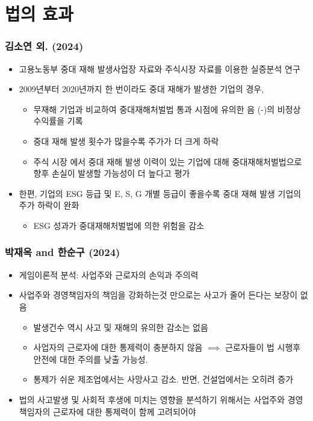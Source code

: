 \documentclass[aspectratio=169,xcolor=dvipsnames,handout]{beamer}
\begin{document}
\section{법의 효과}
\begin{frame}
    \frametitle{김소연 외. (2024)}
    \begin{itemize}[<+->]
        \item 고용노동부 중대 재해 발생사업장 자료와 주식시장 자료를 이용한 실증분석 연구
        \item 2009년부터 2020년까지 한 번이라도 중대 재해가 발생한 기업의 경우,
\begin{itemize}
               \item 무재해 기업과 비교하여 중대재해처벌법 통과 시점에 유의한 음 (-)의 비정상 수익률을 기록
               \item 중대 재해 발생 횟수가 많을수록 주가가 더 크게 하락
        \item 주식 시장 에서 중대 재해 발생 이력이 있는 기업에 대해 중대재해처벌법으로 향후 손실이 발생할 가능성이 더 높다고 평가
\end{itemize}
        \item 한편, 기업의 ESG 등급 및 E, S, G 개별 등급이 좋을수록 중대 재해 발생 기업의 주가 하락이 완화
\begin{itemize}
               \item ESG 성과가 중대재해처벌법에 의한 위험을 감소
\end{itemize}
    \end{itemize}
\end{frame}

\begin{frame}
    \frametitle{박재옥 and 한순구 (2024)}
    \begin{itemize}[<+->]
        \item 게임이론적 분석: 사업주와 근로자의 손익과 주의력
        \item 사업주와 경영책임자의 책임을 강화하는것 만으로는 사고가 줄어 든다는 보장이 없음
\begin{itemize}
               \item 발생건수 역시 사고 및 재해의 유의한 감소는 없음
               \item 사업자의 근로자에 대한 통제력이 충분하지 않음 $\implies$ 근로자들이 법 시행후 안전에 대한 주의를 낮출 가능성.
               \item 통제가 쉬운 제조업에서는 사망사고 감소. 반면, 건설업에서는 오히려 증가
\end{itemize}
        \item 법의 사고발생 및 사회적 후생에 미치는 영향을 분석하기 위해서는 사업주와 경영책임자의 근로자에 대한 통제력이 함께 고려되어야
    \end{itemize}
\end{frame}
\end{document}
